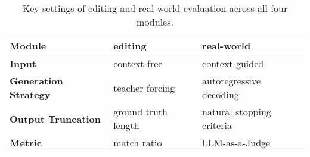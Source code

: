
\begin{table}[t]
\centering
\renewcommand{\arraystretch}{1}
\begin{adjustbox}{max width=\linewidth} 
\begin{tabular}{l l l}
    \toprule
    \textbf{Module} & \textbf{editing} & \textbf{real-world} \\ 
    \midrule
    \textbf{Input} &   context-free & context-guided \\ 
    \textbf{Generation Strategy} & teacher forcing & autoregressive decoding \\ 
    \textbf{Output Truncation} & ground truth length & natural stopping criteria \\ 
    \textbf{Metric} &   match ratio & LLM-as-a-Judge \\ 
    \bottomrule
\end{tabular}
\end{adjustbox}
\caption{Key settings of editing and real-world evaluation across all four modules.}
\label{tab:comp_evals}
\end{table}





